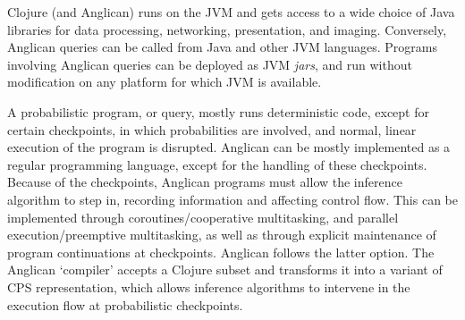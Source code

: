 \documentclass[preprint]{sigplanconf}
\begin{document}
Clojure (and Anglican) runs on the JVM and gets access to a wide choice of Java
libraries for data processing, networking, presentation, and imaging.
Conversely, Anglican queries can be called from Java and other JVM languages.
Programs involving Anglican queries can be deployed as JVM
\textit{jars}, and run without modification on any platform for
which JVM is available.

A probabilistic program, or query, mostly runs deterministic
code, except for certain checkpoints, in which probabilities are
involved, and normal, linear execution of the program is
disrupted.
\iftoggle{full}{%
In Anglican and similar languages there are two types
of such checkpoints:

\begin{itemize}
    \item drawing a value from a random source (\texttt{sample});
    \item conditioning a computed value on a random source
        (\texttt{observe}).
\end{itemize}

}{%
}%
Anglican can be mostly implemented as a regular programming
language, except for the handling of these checkpoints.
\iftoggle{full}{%
Depending on the \textit{inference algorithm}, \texttt{sample}
and \texttt{observe} may result in implicit input/output
operations and control changes. For example, \texttt{observe} in
particle filtering inference algorithms \cite{WVM14} is a non-deterministic
control statement at which a particle (corresponding to
a user-level thread executing a program)
can be either replicated or terminated. Similarly, in 
Metropolis-Hastings \cite{WSG11},
\texttt{sample} is both an input
statement which `reads' values from a random source,
and a non-deterministic control statement
(with delayed effect), eventually affecting acceptance or
rejection of a sample.

}{%
}%
Because of the checkpoints, Anglican programs must allow the
inference algorithm to step in, recording information and
affecting control flow. This can be implemented through
coroutines/cooperative multitasking, and parallel execution/preemptive
multitasking, as well as through explicit
maintenance of program continuations at checkpoints. Anglican
follows the latter option.
\iftoggle{full}{%
Clojure is
a functional language, and continuation-passing style (CPS)
transformation is a well-developed technique in the area of
functional languages. Implementing a variant of CPS
transformation seemed to be the most flexible and lightweight
option --- any other form of concurrency would put a higher burden
on the underlying runtime (JVM) and the operating system.
Consequently, Anglican has been implemented as a CPS-transformed
computation with access to continuations in probabilistic
checkpoints. 
}{%
}%
The Anglican `compiler'\iftoggle{full}{, represented by a set of
functions in the \texttt{anglican.trap} namespace,}{} accepts a
Clojure subset and transforms it into a variant of CPS
representation, which allows inference algorithms to intervene
in the execution flow at probabilistic checkpoints.
\end{document}
